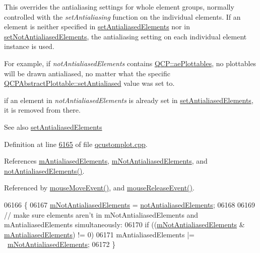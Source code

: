 This overrides the antialiasing settings for whole element groups, normally controlled with the {\itshape set\+Antialiasing} function on the individual elements. If an element is neither specified in \hyperlink{a00116_af6f91e5eab1be85f67c556e98c3745e8}{set\+Antialiased\+Elements} nor in \hyperlink{a00116_ae10d685b5eabea2999fb8775ca173c24}{set\+Not\+Antialiased\+Elements}, the antialiasing setting on each individual element instance is used.

For example, if {\itshape not\+Antialiased\+Elements} contains \hyperlink{a00143_ae55dbe315d41fe80f29ba88100843a0ca4145e4251b0cf2dbedabeea0a38f84f6}{Q\+C\+P\+::ae\+Plottables}, no plottables will be drawn antialiased, no matter what the specific \hyperlink{a00044_a4fd43e89be4a553ead41652565ff0581}{Q\+C\+P\+Abstract\+Plottable\+::set\+Antialiased} value was set to.

if an element in {\itshape not\+Antialiased\+Elements} is already set in \hyperlink{a00116_af6f91e5eab1be85f67c556e98c3745e8}{set\+Antialiased\+Elements}, it is removed from there.

\begin{DoxySeeAlso}{See also}
\hyperlink{a00116_af6f91e5eab1be85f67c556e98c3745e8}{set\+Antialiased\+Elements} 
\end{DoxySeeAlso}


Definition at line \hyperlink{a00115_source_l06165}{6165} of file \hyperlink{a00115_source}{qcustomplot.\+cpp}.



References \hyperlink{a00116_source_l02123}{m\+Antialiased\+Elements}, \hyperlink{a00116_source_l02123}{m\+Not\+Antialiased\+Elements}, and \hyperlink{a00116_source_l01970}{not\+Antialiased\+Elements()}.



Referenced by \hyperlink{a00115_source_l07639}{mouse\+Move\+Event()}, and \hyperlink{a00115_source_l07691}{mouse\+Release\+Event()}.


\begin{DoxyCode}
06166 \{
06167   \hyperlink{a00116_ac566e9d774e49dc4190346e02f31dcdf}{mNotAntialiasedElements} = \hyperlink{a00116_ad611ed86732d07774545f5bd4b7f18b7}{notAntialiasedElements};
06168   
06169   \textcolor{comment}{// make sure elements aren't in mNotAntialiasedElements and mAntialiasedElements simultaneously:}
06170   \textcolor{keywordflow}{if} ((\hyperlink{a00116_ac566e9d774e49dc4190346e02f31dcdf}{mNotAntialiasedElements} & \hyperlink{a00116_a18feaee1080c45b74782bdbf0c252f89}{mAntialiasedElements}) != 0)
06171     mAntialiasedElements |= ~\hyperlink{a00116_ac566e9d774e49dc4190346e02f31dcdf}{mNotAntialiasedElements};
06172 \}
\end{DoxyCode}


